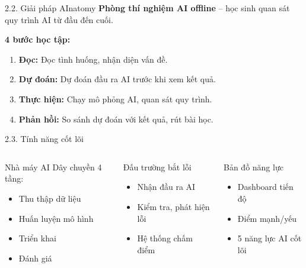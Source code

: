 \documentclass[10pt, aspectratio=169]{beamer}
\begin{document}
\begin{frame}{2.2. Giải pháp AInatomy}
    \textbf{Phòng thí nghiệm AI offline} -- học sinh quan sát quy trình AI từ đầu đến cuối.
    
    \vspace{0.5em}
    \textbf{4 bước học tập:}
    \begin{enumerate}
        \item \textbf{Đọc:} Đọc tình huống, nhận diện vấn đề.
        \item \textbf{Dự đoán:} Dự đoán đầu ra AI trước khi xem kết quả.
        \item \textbf{Thực hiện:} Chạy mô phỏng AI, quan sát quy trình.
        \item \textbf{Phản hồi:} So sánh dự đoán với kết quả, rút bài học.
    \end{enumerate}
\end{frame}

\begin{frame}{2.3. Tính năng cốt lõi}
    \begin{columns}
        \begin{block}{Nhà máy AI}
            Dây chuyền 4 tầng:
            \begin{itemize}
                \item Thu thập dữ liệu
                \item Huấn luyện mô hình
                \item Triển khai
                \item Đánh giá
            \end{itemize}
        \end{block}
        \begin{block}{Đấu trường bắt lỗi}
            \begin{itemize}
                \item Nhận đầu ra AI
                \item Kiểm tra, phát hiện lỗi
                \item Hệ thống chấm điểm
            \end{itemize}
        \end{block}
        \begin{block}{Bản đồ năng lực}
            \begin{itemize}
                \item Dashboard tiến độ
                \item Điểm mạnh/yếu
                \item 5 năng lực AI cốt lõi
            \end{itemize}
        \end{block}
    \end{columns}
\end{frame}
\end{document}
